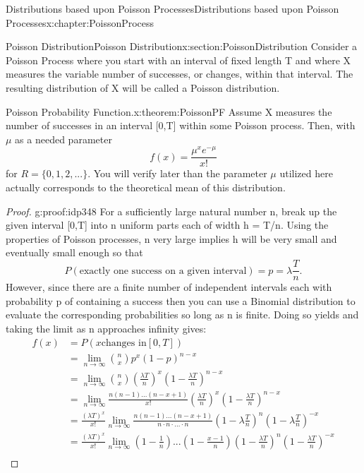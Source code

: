 \documentclass[oneside,10pt,]{book}
\numberwithin{equation}{section}
\begin{document}
\begin{chapterptx}{Distributions based upon Poisson Processes}{}{Distributions based upon Poisson Processes}{}{}{x:chapter:PoissonProcess}
%
\begin{sectionptx}{Poisson Distribution}{}{Poisson Distribution}{}{}{x:section:PoissonDistribution}
Consider a Poisson Process where you start with an interval of fixed length T and where X measures the variable number of successes, or changes, within that interval. The resulting distribution of X will be called a Poisson distribution.%
\par
\begin{theorem}{Poisson Probability Function.}{}{x:theorem:PoissonPF}%
Assume X measures the number of successes in an interval [0,T] within some Poisson process. Then, with \(\mu\) as a needed parameter%
\begin{equation*}
f(x) = \frac{\mu^x e^{-\mu}}{x!}
\end{equation*}
for \(R = \{ 0, 1, 2, ... \}.\)%
 You will verify later than the parameter \(\mu\) utilized here actually corresponds to the theoretical mean of this distribution.\end{theorem}
\begin{proof}{}{g:proof:idp348}
For a sufficiently large natural number n, break up the given interval [0,T] into n uniform parts each of width h = T\slash{}n.  Using the properties of Poisson processes, n very large implies h will be very small and eventually small enough so that%
\begin{equation*}
P(\text{exactly one success on a given interval}) = p = \lambda \frac{T}{n}.
\end{equation*}
However, since there are a finite number of independent intervals each with probability p of containing a success then you can use a Binomial distribution to evaluate the corresponding probabilities so long as n is finite. Doing so yields and taking the limit as n approaches infinity gives:%
\begin{align*}
f(x) & = P(x \text{changes in} [0,T]) \\
& = \lim_{n \rightarrow \infty} \binom{n}{x} p^x (1-p)^{n-x}\\
& = \lim_{n \rightarrow \infty} \binom{n}{x} (\frac{\lambda T}{n})^x (1-\frac{\lambda T}{n})^{n-x}\\
& = \lim_{n \rightarrow \infty} \frac{n(n-1)...(n-x+1)}{x!} ( \frac{\lambda T}{n})^x (1- \frac{\lambda T}{n})^{n-x}\\
& = \frac{(\lambda T)^x}{x!} \lim_{n \rightarrow \infty} \frac{n(n-1)...(n-x+1)}{n \cdot n \cdot ... \cdot n} (1-\lambda \frac{T}{n})^{n}(1-\lambda \frac{T}{n})^{-x}\\
& = \frac{(\lambda T)^x}{x!} \lim_{n \rightarrow \infty} (1-\frac{1}{n})...(1-\frac{x-1}{n})  (1- \frac{\lambda T}{n})^{n}(1- \frac{\lambda T}{n})^{-x}\\

\end{align*}
\end{proof}
\end{sectionptx}
\end{chapterptx}
\end{document}
